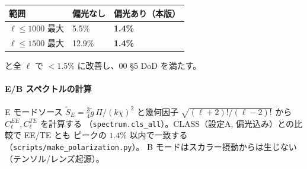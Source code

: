 \begin{center}
\begin{tabular}{lll}
\hline
範囲 & 偏光なし & 偏光あり（本版） \\
\hline
$\ell\le1000$ 最大 & 5.5\% & \textbf{1.4\%} \\
$\ell\le1500$ 最大 & 12.9\% & \textbf{1.4\%} \\
\hline
\end{tabular}
\end{center}
と全 $\ell$ で $<1.5\%$ に改善し、$00$ §5 DoD を満たす。

\paragraph{E/B スペクトルの計算}
E モードソース $\tilde S_E=\frac34\tilde g\,\Pi/(k\chi)^2$ と幾何因子
$\sqrt{(\ell+2)!/(\ell-2)!}$ から $C_\ell^{EE},C_\ell^{TE}$ を計算する
（\texttt{spectrum.cls\_all}）。CLASS（設定A, 偏光込み）との比較で EE/TE とも
ピークの $1.4\%$ 以内で一致する（\texttt{scripts/make\_polarization.py}）。
B モードはスカラー摂動からは生じない（テンソル/レンズ起源）。
